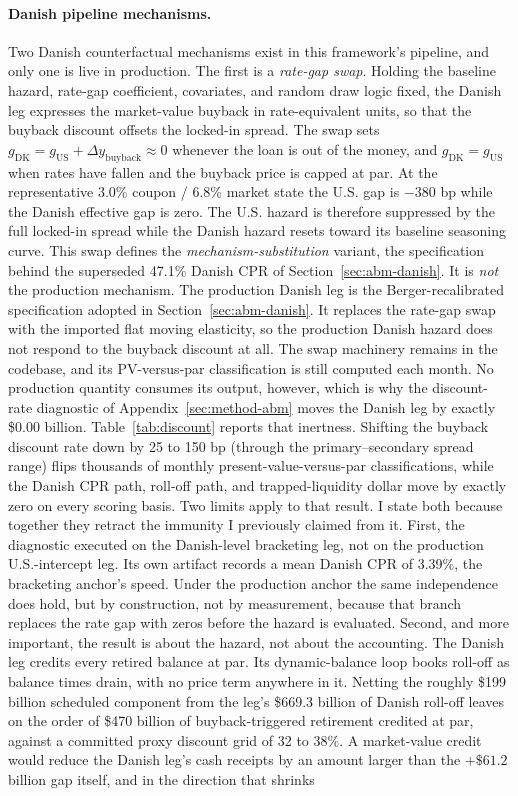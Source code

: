 \documentclass[12pt]{article}
\begin{document}
\paragraph{Danish pipeline mechanisms.}
Two Danish counterfactual mechanisms exist in this framework's pipeline, and only one is live in production. The first is a \emph{rate-gap swap}. Holding the baseline hazard, rate-gap coefficient, covariates, and random draw logic fixed, the Danish leg expresses the market-value buyback in rate-equivalent units, so that the buyback discount offsets the locked-in spread. The swap sets $g_{\mathrm{DK}} = g_{\mathrm{US}} + \Delta y_{\mathrm{buyback}} \approx 0$ whenever the loan is out of the money, and $g_{\mathrm{DK}} = g_{\mathrm{US}}$ when rates have fallen and the buyback price is capped at par. At the representative 3.0\% coupon / 6.8\% market state the U.S. gap is $-380$ bp while the Danish effective gap is zero. The U.S. hazard is therefore suppressed by the full locked-in spread while the Danish hazard resets toward its baseline seasoning curve. This swap defines the \emph{mechanism-substitution} variant, the specification behind the superseded 47.1\% Danish CPR of Section~\ref{sec:abm-danish}. It is \emph{not} the production mechanism. The production Danish leg is the Berger-recalibrated specification adopted in Section~\ref{sec:abm-danish}. It replaces the rate-gap swap with the imported flat moving elasticity, so the production Danish hazard does not respond to the buyback discount at all. The swap machinery remains in the codebase, and its PV-versus-par classification is still computed each month. No production quantity consumes its output, however, which is why the discount-rate diagnostic of Appendix~\ref{sec:method-abm} moves the Danish leg by exactly \$0.00 billion. Table~\ref{tab:discount} reports that inertness. Shifting the buyback discount rate down by 25 to 150 bp (through the primary--secondary spread range) flips thousands of monthly present-value-versus-par classifications, while the Danish CPR path, roll-off path, and trapped-liquidity dollar move by exactly zero on every scoring basis. Two limits apply to that result. I state both because together they retract the immunity I previously claimed from it. First, the diagnostic executed on the Danish-level bracketing leg, not on the production U.S.-intercept leg. Its own artifact records a mean Danish CPR of 3.39\%, the bracketing anchor's speed. Under the production anchor the same independence does hold, but by construction, not by measurement, because that branch replaces the rate gap with zeros before the hazard is evaluated. Second, and more important, the result is about the hazard, not about the accounting. The Danish leg credits every retired balance at par. Its dynamic-balance loop books roll-off as balance times drain, with no price term anywhere in it. Netting the roughly \$199 billion scheduled component from the leg's \$669.3 billion of Danish roll-off leaves on the order of \$470 billion of buyback-triggered retirement credited at par, against a committed proxy discount grid of 32 to 38\%. A market-value credit would reduce the Danish leg's cash receipts by an amount larger than the $+\$61.2$ billion gap itself, and in the direction that shrinks 
\end{document}
